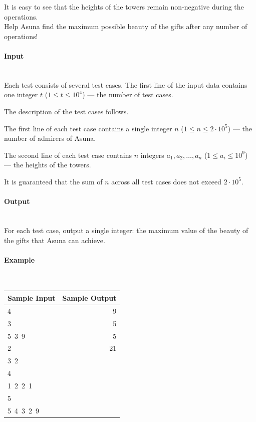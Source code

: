 \documentclass{article}
\begin{document}
It is easy to see that the heights of the towers remain non-negative during the operations. \\
Help Asuna find the maximum possible beauty of the gifts after any number of operations!

\paragraph{Input} \mbox{} \\

Each test consists of several test cases. The first line of the input data contains one integer $t$ ($1 \le t \le 10^4$) — the number of test cases.

The description of the test cases follows.

The first line of each test case contains a single integer $n$ ($1 \le n \le 2 \cdot 10^5$) — the number of admirers of Asuna.

The second line of each test case contains $n$ integers $a_1, a_2, \dots, a_n$ ($1 \le a_i \le 10^9$) — the heights of the towers.

It is guaranteed that the sum of $n$ across all test cases does not exceed $2 \cdot 10^5$.


\paragraph{Output}\mbox{} \\
For each test case, output a single integer: the maximum value of the beauty of the gifts that Asuna can achieve.


\paragraph{Example}\mbox{} \\

\begin{table}[h]
    \centering
    \begin{tabular}{|l|r|}
        \hline
        \textbf{Sample Input} & \textbf{Sample Output} \\
        \hline
        4 & 9 \\
        3 & 5 \\
        5\ 3\ 9 & 5 \\
        2 & 21 \\
        3\ 2 & \\
        4 & \\
        1\ 2\ 2\ 1 & \\
        5 & \\
        5\ 4\ 3\ 2\ 9 & \\
        \hline
    \end{tabular}
\end{table}
\end{document}
